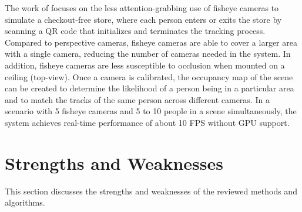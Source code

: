 The work of \textcite{Wang21} focuses on the less attention-grabbing use of fisheye cameras to simulate a checkout-free store, where each person enters or exits the store by scanning a QR code that initializes and terminates the tracking process. Compared to perspective cameras, fisheye cameras are able to cover a larger area with a single camera, reducing the number of cameras needed in the system. In addition, fisheye cameras are less susceptible to occlusion when mounted on a ceiling (top-view). Once a camera is calibrated, the occupancy map of the scene can be created to determine the likelihood of a person being in a particular area and to match the tracks of the same person across different cameras. In a scenario with 5 fisheye cameras and 5 to 10 people in a scene simultaneously, the system achieves real-time performance of about 10 FPS without GPU support.


\section{Strengths and Weaknesses}\label{sec:strengths_and_weaknesses}
This section discusses the strengths and weaknesses of the reviewed methods and algorithms.




